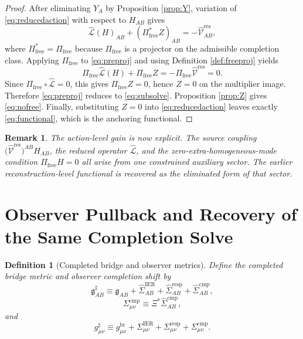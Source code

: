\documentclass[11pt]{article}
\newcommand{\ObserverMap}{\Xi}
\newcommand{\BridgeMetric}{\mathfrak g}
\newcommand{\ObserverMetric}{g^{\mathrm{br}}}
\newcommand{\CompletedMetric}{g^{\sharp}}
\newcommand{\BaseShift}{\Sigma^{\mathrm{IER}}}
\newcommand{\ResponseShift}{\Sigma^{\mathrm{resp}}}
\newcommand{\CompShift}{\Sigma^{\mathrm{cmp}}}
\newcommand{\BaseLift}{\widehat\Sigma^{\mathrm{IER}}}
\newcommand{\ResponseLift}{\widehat\Sigma^{\mathrm{resp}}}
\newcommand{\CompLift}{\widehat\Sigma^{\mathrm{cmp}}}
\newcommand{\ResidualLift}{\widehat{\mathcal V}^{\mathrm{res}}}
\newcommand{\SubReducedEin}{\widehat{\mathcal L}}
\newcommand{\FreeProj}{\Pi_{\mathrm{free}}}
\newcommand{\GaugeAux}{Y}
\newcommand{\ModeAux}{Z}
\newtheorem{definition}{Definition}
\newtheorem{remark}{Remark}
\begin{document}
\begin{proof}
After eliminating \(\GaugeAux_A\) by Proposition \ref{prop:Y}, variation of \eqref{eq:reducedaction} with respect to \(H_{AB}\) gives
\begin{equation}
\SubReducedEin(H)_{AB}
+(\FreeProj^\ast \ModeAux)_{AB}
=
-\ResidualLift_{AB},
\label{eq:preproj}
\end{equation}
where \(\FreeProj^\ast=\FreeProj\) because \(\FreeProj\) is a projector on the admissible completion class. Applying \(\FreeProj\) to \eqref{eq:preproj} and using Definition \ref{def:freeproj} yields
\[
\FreeProj\SubReducedEin(H)
+\FreeProj\ModeAux
=
-\FreeProj\ResidualLift
=
0.
\]
Since \(\FreeProj\circ\SubReducedEin=0\), this gives \(\FreeProj\ModeAux=0\), hence \(\ModeAux=0\) on the multiplier image. Therefore \eqref{eq:preproj} reduces to \eqref{eq:subsolve}. Proposition \ref{prop:Z} gives \eqref{eq:nofree}. Finally, substituting \(\ModeAux=0\) into \eqref{eq:reducedaction} leaves exactly \eqref{eq:functional}, which is the anchoring functional.
\end{proof}

\begin{remark}
The action-level gain is now explicit. The source coupling \(\bigl(\ResidualLift\bigr)^{AB}H_{AB}\), the reduced operator \(\SubReducedEin\), and the zero-extra-homogeneous-mode condition \(\FreeProj H=0\) all arise from one constrained auxiliary sector. The earlier reconstruction-level functional is recovered as the eliminated form of that sector.
\end{remark}

\section{Observer Pullback and Recovery of the Same Completion Solve}

\begin{definition}[Completed bridge and observer metrics]
\label{def:completed}
Define the completed bridge metric and observer completion shift by
\begin{equation}
\BridgeMetric_{AB}^{\sharp}
\equiv
\BridgeMetric_{AB}
+\BaseLift_{AB}
+\ResponseLift_{AB}
+\CompLift_{AB},
\label{eq:bridgecompleted}
\end{equation}
\begin{equation}
\CompShift_{\mu\nu}
\equiv
\ObserverMap^*\CompLift_{AB},
\label{eq:defsigma}
\end{equation}
and
\begin{equation}
\CompletedMetric_{\mu\nu}
\equiv
\ObserverMetric_{\mu\nu}
+\BaseShift_{\mu\nu}
+\ResponseShift_{\mu\nu}
+\CompShift_{\mu\nu}.
\label{eq:gsharp}
\end{equation}
\end{definition}
\end{document}
